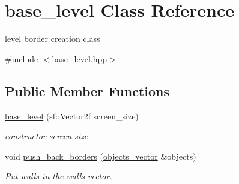 \hypertarget{classbase__level}{}\section{base\+\_\+level Class Reference}
\label{classbase__level}


level border creation class  




{\ttfamily \#include $<$base\+\_\+level.\+hpp$>$}

\subsection*{Public Member Functions}
\begin{DoxyCompactItemize}
\item 
\hyperlink{classbase__level_addf165fdc5f4e953be3b6a2dcd00459b}{base\+\_\+level} (sf\+::\+Vector2f screen\+\_\+size)
\begin{DoxyCompactList}\small\item\em constructor screen size \end{DoxyCompactList}\item 
void \hyperlink{classbase__level_a3b2da28cf45cad434103e81ee6c4538d}{push\+\_\+back\+\_\+borders} (\hyperlink{typedefs_8hpp_a6c0fdb1dfd0c34dbbdbb5dcd3c608b07}{objects\+\_\+vector} \&objects)
\begin{DoxyCompactList}\small\item\em Put walls in the walls vector. \end{DoxyCompactList}\end{DoxyCompactItemize}
